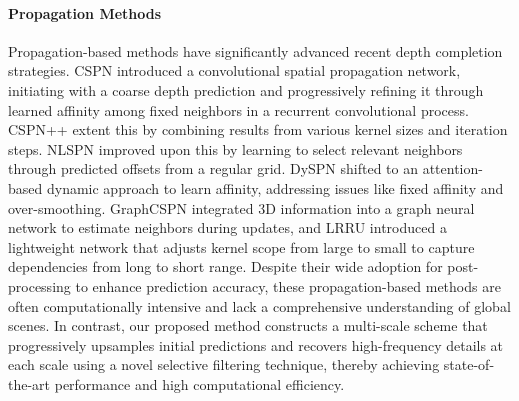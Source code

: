 \paragraph{Propagation Methods}
Propagation-based methods have significantly advanced recent depth completion strategies. CSPN \cite{cspn} introduced a convolutional spatial propagation network, initiating with a coarse depth prediction and progressively refining it through learned affinity among fixed neighbors in a recurrent convolutional process. CSPN++ \cite{cspn++} extent this by combining results from various kernel sizes and iteration steps. NLSPN \cite{nlspn} improved upon this by learning to select relevant neighbors through predicted offsets from a regular grid. DySPN \cite{dyspn, lin2023dyspn} shifted to an attention-based dynamic approach to learn affinity, addressing issues like fixed affinity and over-smoothing. GraphCSPN \cite{graphcspn} integrated 3D information into a graph neural network to estimate neighbors during updates, and LRRU \cite{lrru} introduced a lightweight network that adjusts kernel scope from large to small to capture dependencies from long to short range. Despite their wide adoption for post-processing to enhance prediction accuracy, these propagation-based methods are often computationally intensive and lack a comprehensive understanding of global scenes. In contrast, our proposed method constructs a multi-scale scheme that progressively upsamples initial predictions and recovers high-frequency details at each scale using a novel selective filtering technique, thereby achieving state-of-the-art performance and high computational efficiency.